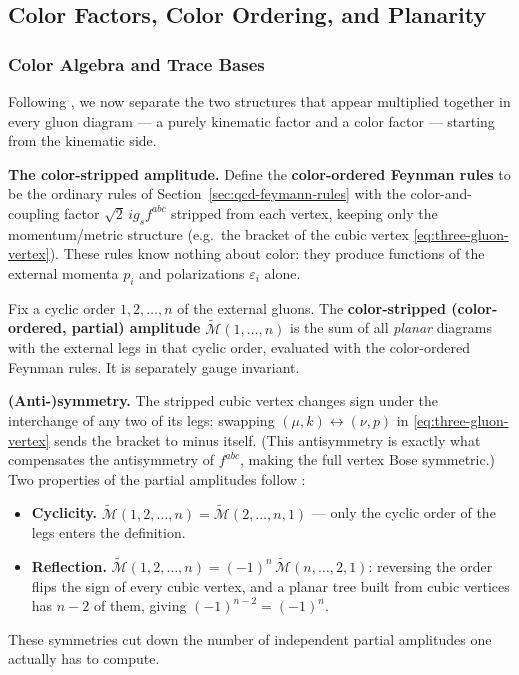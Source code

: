 \subsection{Color Factors, Color Ordering, and Planarity}
\label{sec:color-ordering-planarity}

\subsubsection{Color Algebra and Trace Bases}
\label{subsubsec:color-algebra-and-trace-bases}
Following \autocite[\S27.4]{schwartzQFT2014}, we now separate the two structures that appear multiplied together in every gluon diagram --- a purely kinematic factor and a color factor --- starting from the kinematic side.

\textbf{The color-stripped amplitude.} Define the \textbf{color-ordered Feynman rules} to be the ordinary rules of Section~\ref{sec:qcd-feymann-rules} with the color-and-coupling factor $\sqrt{2}\, i g_s f^{abc}$ stripped from each vertex, keeping only the momentum/metric structure (e.g.\ the bracket of the cubic vertex \eqref{eq:three-gluon-vertex}). These rules know nothing about color: they produce functions of the external momenta $p_i$ and polarizations $\varepsilon_i$ alone.

\begin{definition}
    Fix a cyclic order $1, 2, \ldots, n$ of the external gluons. The \textbf{color-stripped (color-ordered, partial) amplitude} $\widetilde{\mathcal{M}}(1, \ldots, n)$ is the sum of all \emph{planar} diagrams with the external legs in that cyclic order, evaluated with the color-ordered Feynman rules. It is separately gauge invariant.
\end{definition}

\textbf{(Anti-)symmetry.} The stripped cubic vertex changes sign under the interchange of any two of its legs: swapping $(\mu, k) \leftrightarrow (\nu, p)$ in \eqref{eq:three-gluon-vertex} sends the bracket to minus itself. (This antisymmetry is exactly what compensates the antisymmetry of $f^{abc}$, making the full vertex Bose symmetric.) Two properties of the partial amplitudes follow \autocite[\S27.4]{schwartzQFT2014}:
\begin{itemize}
    \item \textbf{Cyclicity.} $\widetilde{\mathcal{M}}(1, 2, \ldots, n) = \widetilde{\mathcal{M}}(2, \ldots, n, 1)$ --- only the cyclic order of the legs enters the definition.
    \item \textbf{Reflection.} $\widetilde{\mathcal{M}}(1, 2, \ldots, n) = (-1)^{n}\, \widetilde{\mathcal{M}}(n, \ldots, 2, 1)$: reversing the order flips the sign of every cubic vertex, and a planar tree built from cubic vertices has $n - 2$ of them, giving $(-1)^{n-2} = (-1)^n$.
\end{itemize}
These symmetries cut down the number of independent partial amplitudes one actually has to compute.

